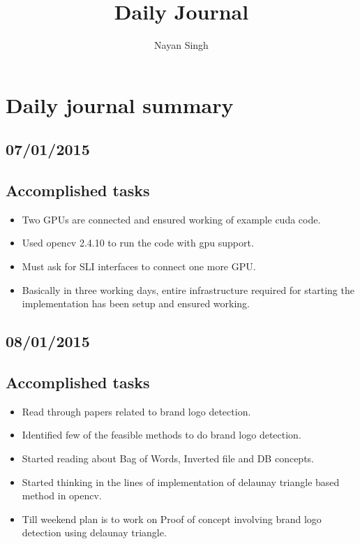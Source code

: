 \documentclass[]{article}
\title{Daily Journal}
\author{Nayan Singh}
\begin{document}
\maketitle

\section{ Daily journal summary }
\subsection {07/01/2015 \\ \\ Accomplished tasks}
\begin{itemize}

\item Two GPUs are connected and ensured working of example cuda code.
\item Used opencv 2.4.10 to run the code with gpu support.
\item Must ask for SLI interfaces to connect one more GPU.
\item Basically in three working days, entire infrastructure required for starting the implementation has been setup and ensured working.

\end{itemize}


\subsection {08/01/2015 \\ \\ Accomplished tasks}
\begin{itemize}

\item Read through papers related to brand logo detection.
\item Identified few of the feasible methods to do brand logo detection.
\item Started reading about Bag of Words, Inverted file and DB concepts.
\item Started thinking in the lines of implementation of delaunay triangle based method in opencv.
\item Till weekend plan is to work on Proof of concept involving brand logo detection using delaunay triangle.
\end{itemize}
  
\end{document}
